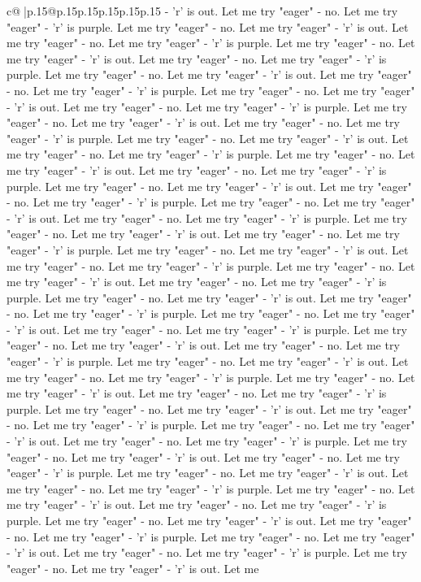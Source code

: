 \documentclass{article}
\begin{document}
{\begin{supertabular}{c@{$\;$}|p{.15\linewidth}@{}p{.15\linewidth}p{.15\linewidth}p{.15\linewidth}p{.15\linewidth}p{.15\linewidth}}
{{{{-} 'r' is out. Let me try "eager" {-} no. Let me try "eager" {-} 'r' is purple. Let me try "eager" {-} no. Let me try "eager" {-} 'r' is out. Let me try "eager" {-} no. Let me try "eager" {-} 'r' is purple. Let me try "eager" {-} no. Let me try "eager" {-} 'r' is out. Let me try "eager" {-} no. Let me try "eager" {-} 'r' is purple. Let me try "eager" {-} no. Let me try "eager" {-} 'r' is out. Let me try "eager" {-} no. Let me try "eager" {-} 'r' is purple. Let me try "eager" {-} no. Let me try "eager" {-} 'r' is out. Let me try "eager" {-} no. Let me try "eager" {-} 'r' is purple. Let me try "eager" {-} no. Let me try "eager" {-} 'r' is out. Let me try "eager" {-} no. Let me try "eager" {-} 'r' is purple. Let me try "eager" {-} no. Let me try "eager" {-} 'r' is out. Let me try "eager" {-} no. Let me try "eager" {-} 'r' is purple. Let me try "eager" {-} no. Let me try "eager" {-} 'r' is out. Let me try "eager" {-} no. Let me try "eager" {-} 'r' is purple. Let me try "eager" {-} no. Let me try "eager" {-} 'r' is out. Let me try "eager" {-} no. Let me try "eager" {-} 'r' is purple. Let me try "eager" {-} no. Let me try "eager" {-} 'r' is out. Let me try "eager" {-} no. Let me try "eager" {-} 'r' is purple. Let me try "eager" {-} no. Let me try "eager" {-} 'r' is out. Let me try "eager" {-} no. Let me try "eager" {-} 'r' is purple. Let me try "eager" {-} no. Let me try "eager" {-} 'r' is out. Let me try "eager" {-} no. Let me try "eager" {-} 'r' is purple. Let me try "eager" {-} no. Let me try "eager" {-} 'r' is out. Let me try "eager" {-} no. Let me try "eager" {-} 'r' is purple. Let me try "eager" {-} no. Let me try "eager" {-} 'r' is out. Let me try "eager" {-} no. Let me try "eager" {-} 'r' is purple. Let me try "eager" {-} no. Let me try "eager" {-} 'r' is out. Let me try "eager" {-} no. Let me try "eager" {-} 'r' is purple. Let me try "eager" {-} no. Let me try "eager" {-} 'r' is out. Let me try "eager" {-} no. Let me try "eager" {-} 'r' is purple. Let me try "eager" {-} no. Let me try "eager" {-} 'r' is out. Let me try "eager" {-} no. Let me try "eager" {-} 'r' is purple. Let me try "eager" {-} no. Let me try "eager" {-} 'r' is out. Let me try "eager" {-} no. Let me try "eager" {-} 'r' is purple. Let me try "eager" {-} no. Let me try "eager" {-} 'r' is out. Let me try "eager" {-} no. Let me try "eager" {-} 'r' is purple. Let me try "eager" {-} no. Let me try "eager" {-} 'r' is out. Let me try "eager" {-} no. Let me try "eager" {-} 'r' is purple. Let me try "eager" {-} no. Let me try "eager" {-} 'r' is out. Let me try "eager" {-} no. Let me try "eager" {-} 'r' is purple. Let me try "eager" {-} no. Let me try "eager" {-} 'r' is out. Let me try "eager" {-} no. Let me try "eager" {-} 'r' is purple. Let me try "eager" {-} no. Let me try "eager" {-} 'r' is out. Let me try "eager" {-} no. Let me try "eager" {-} 'r' is purple. Let me try "eager" {-} no. Let me try "eager" {-} 'r' is out. Let me try "eager" {-} no. Let me try "eager" {-} 'r' is purple. Let me try "eager" {-} no. Let me try "eager" {-} 'r' is out. Let me try "eager" {-} no. Let me try "eager" {-} 'r' is purple. Let me try "eager" {-} no. Let me try "eager" {-} 'r' is out. Let me }}}
\end{supertabular}}
\end{document}
